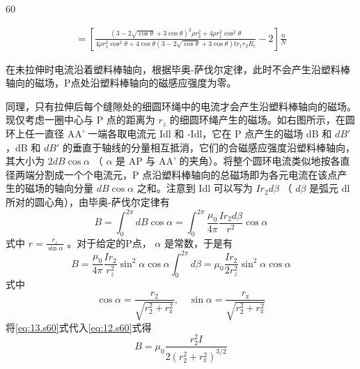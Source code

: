 \begin{solution}{60}
\begin{subsolution}
\begin{equation}
\begin{array}{l}
                = \left[ \frac {(3 - 2 \sqrt {\cos \theta} + 3 \cos \theta)^{2} \rho r _ {2}^{2} + 4 \rho r _ {1}^{2} \cos^{2} \theta}{4 \rho r _ {1}^{2} \cos^{2} \theta + 4 \cos \theta (3 - 2 \sqrt {\cos \theta} + 3 \cos \theta) t r _ {1} r _ {2} R _ {c}} - 2 \right] \frac {n}{N}
            \end{array}
            \label{eq:10.s60}
        \end{equation}
    \end{subsolution}
    \begin{subsolution}
        在未拉伸时电流沿着塑料棒轴向，根据毕奥-萨伐尔定律，此时不会产生沿塑料棒轴向的磁场，P点处沿塑料棒轴向的磁感应强度为零。

        同理，只有拉伸后每个缝隙处的细圆环绳中的电流才会产生沿塑料棒轴向的磁场。现仅考虑一圈中心与 P 点的距离为 $r_{z}$ 的细圆环绳产生的磁场。如右图所示，在圆环上任一直径 AA' 一端各取电流元 Idl 和 -Idl，它在 P 点产生的磁场 dB 和 $dB'$ ，dB 和 $dB'$ 的垂直于轴线的分量相互抵消，它们的合磁感应强度沿塑料棒轴向，其大小为 $2dB\cos\alpha$ （ $\alpha$ 是 AP 与 AA' 的夹角）。将整个圆环电流类似地按各直径两端分割成一个个电流元，P 点沿塑料棒轴向的总磁场即为各元电流在该点产生的磁场的轴向分量 $dB\cos\alpha$ 之和。注意到 Idl 可以写为 $Ir_{2}d\beta$ （ $d\beta$ 是弧元 dl 所对的圆心角），由毕奥-萨伐尔定律有
        \begin{equation}
            B = \int_{0}^{2 \pi} d B \cos \alpha = \int_{0}^{2 \pi} \frac {\mu_{0}}{4 \pi} \frac {I r _ {2} d \beta}{r^{2}} \cos \alpha
            \label{eq:11.s60}
        \end{equation}
        式中 $r = \frac{r_z}{\sin\alpha}$ 。对于给定的P点， $\alpha$ 是常数，于是有
        \begin{equation}
            B = \frac {\mu_{0}}{4 \pi} \frac {I r _ {2}}{r _ {z}^{2}} \sin^{2} \alpha \cos \alpha \int_{0}^{2 \pi} d \beta = \mu_{0} \frac {I r _ {2}}{2 r _ {z}^{2}} \sin^{2} \alpha \cos \alpha
            \label{eq:12.s60}
        \end{equation}
        式中
        \begin{equation}
            \cos \alpha = \frac {r _ {2}}{\sqrt {r _ {2}^{2} + r _ {\mathrm{z}}^{2}}}, \quad \sin \alpha = \frac {r _ {\mathrm{z}}}{\sqrt {r _ {2}^{2} + r _ {\mathrm{z}}^{2}}}
            \label{eq:13.s60}
        \end{equation}
        将\eqref{eq:13.s60}式代入\eqref{eq:12.s60}式得
        \begin{equation}
            B = \mu_{0} \frac {r _ {2}^{2} I}{2 (r _ {2}^{2} + r _ {\mathrm{z}}^{2})^{3 / 2}}

\end{equation}
\end{subsolution}
\end{solution}
